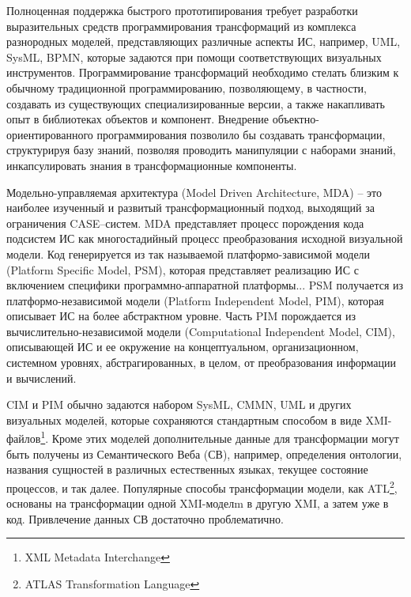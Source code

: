 \documentclass[conference]{IEEEtran} \IEEEoverridecommandlockouts
\begin{document}
Полноценная поддержка быстрого прототипирования требует разработки выразительных средств программирования трансформаций из комплекса разнородных моделей, представляющих различные аспекты ИС, например, UML, SysML, BPMN, которые задаются при помощи соответствующих визуальных инструментов.  Программирование трансформаций необходимо стелать близким к обычному традиционной программированию, позволяющему, в частности, создавать из существующих специализированные версии, а также накапливать опыт в библиотеках объектов и компонент. Внедрение объектно-ориентированного программирования позволило бы создавать трансформации, структурируя базу знаний, позволяя проводить манипуляции с наборами знаний, инкапсулировать знания в трансформационные компоненты. 

Модельно-управляемая архитектура (Model Driven Architecture, MDA) -- это наиболее изученный и развитый трансформационный подход, выходящий за ограничения CASE--систем. MDA представляет процесс порождения кода подсистем ИС как многостадийный процесс преобразования исходной визуальной модели. Код генерируется из так называемой платформо-зависимой модели (Platform Specific Model, PSM), которая представляет реализацию ИС с включением специфики программно-аппаратной платформы... PSM получается из платформо-независимой модели (Platform Independent Model, PIM), которая описывает ИС на более абстрактном уровне. Часть PIM порождается из вычислительно-независимой модели (Computational Independent Model, CIM), описывающей ИС и ее окружение на концептуальном, организационном, системном уровнях, абстрагированных, в целом, от преобразования информации и вычислений. 

CIM и PIM обычно задаются набором SysML, CMMN, UML и других визуальных моделей, которые сохраняются стандартным способом в виде XMI-файлов\footnote{XML Metadata Interchange}. Кроме этих моделей дополнительные данные для трансформации могут быть получены из Семантического Веба (СВ), например, определения онтологии, названия сущностей в различных естественных языках, текущее состояние процессов, и так далее. Популярные способы трансформации модели, как ATL\footnote{ATLAS Transformation Language}, основаны на трансформации одной XMI-моделm в другую XMI, а затем уже в код. Привлечение данных СВ достаточно проблематично. 
\end{document}
